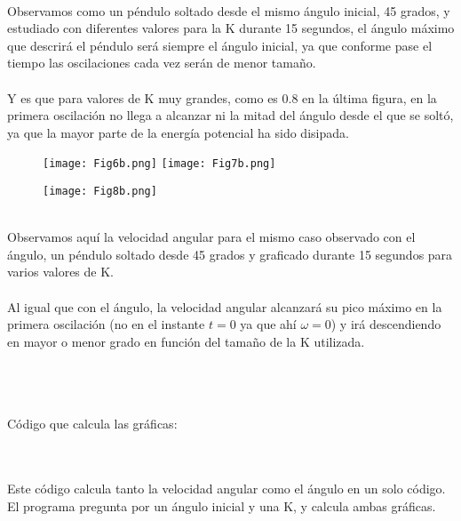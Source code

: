 \documentclass{article}
\begin{document}
\hfill \break \\
Observamos como un péndulo soltado desde el mismo ángulo inicial, 45 grados, y estudiado con diferentes valores para la K durante 15 segundos, el ángulo máximo que descrirá el péndulo será siempre el ángulo inicial, ya que conforme pase el tiempo las oscilaciones cada vez serán de menor tamaño. \\\\Y es que para valores de K muy grandes, como es 0.8 en la última figura, en la primera oscilación no llega a alcanzar ni la mitad del ángulo desde el que se soltó, ya que la mayor parte de la energía potencial ha sido disipada.

\pagebreak

\begin{figure}[h]
\centering
\hspace*{-2.3cm}
\texttt{[image: Fig6b.png]}\hfill
\texttt{[image: Fig7b.png]}
\hspace*{-2.3cm}
\end{figure}
\begin{figure}[h]
\centering
\texttt{[image: Fig8b.png]}
\end{figure}

\hfill \break \\
Observamos aquí la velocidad angular para el mismo caso observado con el ángulo, un péndulo soltado desde 45 grados y graficado durante 15 segundos para varios valores de K. \\ \\Al igual que con el ángulo, la velocidad angular alcanzará su pico máximo en la primera oscilación (no en el instante $t=0$ ya que ahí $\omega = 0$) y irá descendiendo en mayor o menor grado en función del tamaño de la K utilizada.

\pagebreak
\hfill \break \\
\hfill \break \\
\hfill \break \\

Código que calcula las gráficas:
\begin{adjustwidth}{-12pt}{-12pt}

\end{adjustwidth}

\hfill \break \\
\hfill \break \\
Este código calcula tanto la velocidad angular como el ángulo en un solo código. El programa pregunta por un ángulo inicial y una K, y calcula ambas gráficas.
\pagebreak
\end{document}

